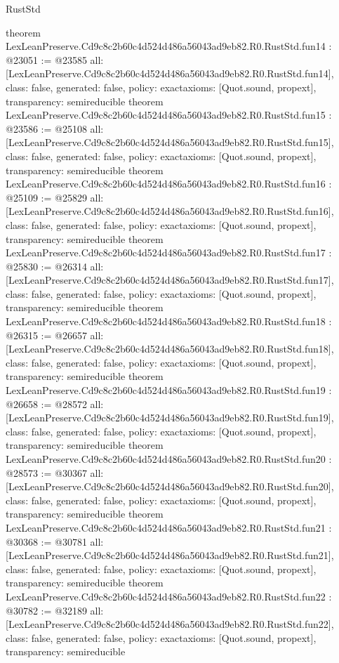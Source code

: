 \begin{lexlean}{RustStd}
\begin{coremodule}
{}
theorem LexLeanPreserve.Cd9c8c2b60c4d524d486a56043ad9eb82.R0.RustStd.fun14 : @23051 := @23585 {
  all: [LexLeanPreserve.Cd9c8c2b60c4d524d486a56043ad9eb82.R0.RustStd.fun14],
  class: false,
  generated: false,
  policy: exact{axioms: [Quot.sound, propext]},
  transparency: semireducible
}
theorem LexLeanPreserve.Cd9c8c2b60c4d524d486a56043ad9eb82.R0.RustStd.fun15 : @23586 := @25108 {
  all: [LexLeanPreserve.Cd9c8c2b60c4d524d486a56043ad9eb82.R0.RustStd.fun15],
  class: false,
  generated: false,
  policy: exact{axioms: [Quot.sound, propext]},
  transparency: semireducible
}
theorem LexLeanPreserve.Cd9c8c2b60c4d524d486a56043ad9eb82.R0.RustStd.fun16 : @25109 := @25829 {
  all: [LexLeanPreserve.Cd9c8c2b60c4d524d486a56043ad9eb82.R0.RustStd.fun16],
  class: false,
  generated: false,
  policy: exact{axioms: [Quot.sound, propext]},
  transparency: semireducible
}
theorem LexLeanPreserve.Cd9c8c2b60c4d524d486a56043ad9eb82.R0.RustStd.fun17 : @25830 := @26314 {
  all: [LexLeanPreserve.Cd9c8c2b60c4d524d486a56043ad9eb82.R0.RustStd.fun17],
  class: false,
  generated: false,
  policy: exact{axioms: [Quot.sound, propext]},
  transparency: semireducible
}
theorem LexLeanPreserve.Cd9c8c2b60c4d524d486a56043ad9eb82.R0.RustStd.fun18 : @26315 := @26657 {
  all: [LexLeanPreserve.Cd9c8c2b60c4d524d486a56043ad9eb82.R0.RustStd.fun18],
  class: false,
  generated: false,
  policy: exact{axioms: [Quot.sound, propext]},
  transparency: semireducible
}
theorem LexLeanPreserve.Cd9c8c2b60c4d524d486a56043ad9eb82.R0.RustStd.fun19 : @26658 := @28572 {
  all: [LexLeanPreserve.Cd9c8c2b60c4d524d486a56043ad9eb82.R0.RustStd.fun19],
  class: false,
  generated: false,
  policy: exact{axioms: [Quot.sound, propext]},
  transparency: semireducible
}
theorem LexLeanPreserve.Cd9c8c2b60c4d524d486a56043ad9eb82.R0.RustStd.fun20 : @28573 := @30367 {
  all: [LexLeanPreserve.Cd9c8c2b60c4d524d486a56043ad9eb82.R0.RustStd.fun20],
  class: false,
  generated: false,
  policy: exact{axioms: [Quot.sound, propext]},
  transparency: semireducible
}
theorem LexLeanPreserve.Cd9c8c2b60c4d524d486a56043ad9eb82.R0.RustStd.fun21 : @30368 := @30781 {
  all: [LexLeanPreserve.Cd9c8c2b60c4d524d486a56043ad9eb82.R0.RustStd.fun21],
  class: false,
  generated: false,
  policy: exact{axioms: [Quot.sound, propext]},
  transparency: semireducible
}
theorem LexLeanPreserve.Cd9c8c2b60c4d524d486a56043ad9eb82.R0.RustStd.fun22 : @30782 := @32189 {
  all: [LexLeanPreserve.Cd9c8c2b60c4d524d486a56043ad9eb82.R0.RustStd.fun22],
  class: false,
  generated: false,
  policy: exact{axioms: [Quot.sound, propext]},
  transparency: semireducible
}
\end{coremodule}
\end{lexlean}
